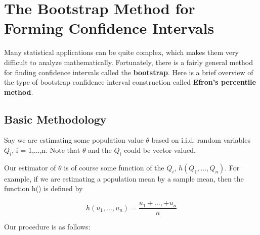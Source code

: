 \section{The Bootstrap Method for Forming Confidence Intervals}
\label{boot}

Many statistical applications can be quite complex, which makes them very
difficult to analyze mathematically.  Fortunately, there is a fairly
general method for finding confidence intervals called the {\bf
bootstrap}.  Here is a brief overview of the type of bootstrap
confidence interval construction called {\bf Efron's percentile method}.

\subsection{Basic Methodology}
\label{basicboot}

Say we are estimating some population value $\theta$ based on i.i.d.
random variables $Q_i$, i = 1,...,n.  Note that $\theta$ and the $Q_i$
could be vector-valued.

Our estimator of $\theta$ is of course some function of the $Q_i$, 
$h(Q_1,...,Q_n)$.  For example, if we are estimating a population mean
by a sample mean, then the function h() is defined by

\begin{equation}
h(u_1,...,u_n) = \frac{u_1+...,+u_n}{n}
\end{equation}

Our procedure is as follows:


